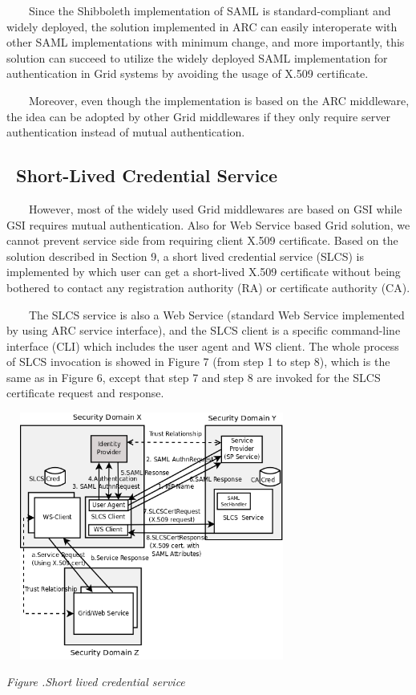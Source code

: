\documentclass{article}
\newcounter{Figure}
\renewcommand\theFigure{\arabic{Figure}}
\begin{document}
{\upshape\color{black}
\ \ \ \ Since the Shibboleth implementation of SAML is
standard-compliant and widely deployed, the solution implemented in ARC
can easily interoperate with other SAML implementations with minimum
change, and more importantly, this solution can succeed to utilize the
widely deployed SAML implementation for authentication in Grid systems
by avoiding the usage of X.509 certificate.}

{\upshape\color{black}
\ \ \ \ Moreover, even though the implementation is based on the ARC
middleware, the idea can be adopted by other Grid middlewares if they
only require server authentication instead of mutual authentication.}


\bigskip

\subsection[\ Short-Lived Credential
Service]{\foreignlanguage{english}{\ }Short-Lived Credential Service}
{\color{black}
\ \ \ \ However, most of the widely used Grid middlewares are based on
GSI while GSI requires mutual authentication. Also for Web Service
based Grid solution, we cannot prevent service side from requiring
client X.509 certificate. Based on the solution described in Section 9,
a short lived credential service (SLCS) is implemented by which user
can get a short-lived X.509 certificate without being bothered to
contact any registration authority (RA) or certificate authority (CA).}

{\upshape\color{black}
\ \ \ \ The SLCS service is also a Web Service (standard Web Service
implemented by using ARC service interface), and the SLCS client is a
specific command-line interface (CLI) which includes the user agent and
WS client. The whole process of SLCS invocation is showed in Figure 7
(from step 1 to step 8), which is the same as in Figure 6, except that
step 7 and step 8 are invoked for the SLCS certificate request and
response.}



\begin{center}
\includegraphics[width=3.7689in,height=3.2055in]{SecurityFrameworkofARC1-img8.png}
\end{center}
{\centering{}\itshape\color{black}
Figure \stepcounter{Figure}{\theFigure}.Short lived credential service
\par}
\end{document}
